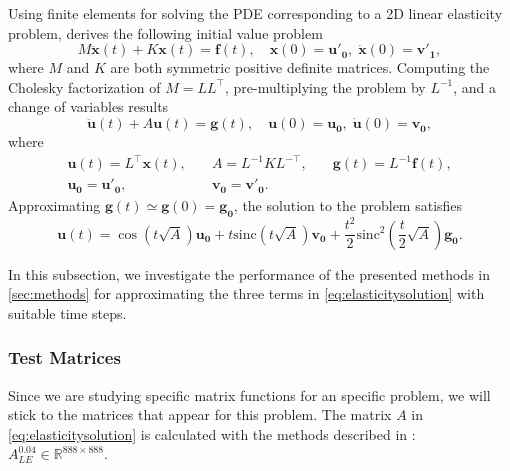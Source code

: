 Using finite elements for solving the PDE corresponding to a 2D linear elasticity problem,
\cite{voet2020linearelasticity} derives the following initial value problem
\begin{equation*}
    M \mathbf{\ddot{x}}(t) + K \mathbf{x}(t) = \mathbf{f}(t), \quad
    \mathbf{x}(0) = \mathbf{u'_0}, \; \mathbf{\dot{x}}(0) = \mathbf{v'_1},
\end{equation*}
where $M$ and $K$ are both symmetric positive definite matrices.
Computing the Cholesky factorization of $M = LL^{\top}$, pre-multiplying the problem by $L^{-1}$,
and a change of variables results
\begin{equation}
    \mathbf{\ddot{u}}(t) + A \mathbf{u}(t) = \mathbf{g}(t), \quad
    \mathbf{u}(0) = \mathbf{u_0}, \; \mathbf{\dot{u}}(0) = \mathbf{v_0},
\end{equation}
where
\begin{equation*}
    \begin{aligned}
        & \mathbf{u}(t) = L^{\top} \mathbf{x}(t), \quad & A = L^{-1} K L^{-\top}, \quad & \mathbf{g}(t) = L^{-1} \mathbf{f}(t), & \\
        & \mathbf{u_0} = \mathbf{u'_0}, & \mathbf{v_0} = \mathbf{v'_0}. & &
    \end{aligned}
\end{equation*}
Approximating $\mathbf{g}(t) \simeq \mathbf{g}(0) = \mathbf{g_0}$, the solution to
the problem satisfies
\begin{equation}
    \label{eq:elasticitysolution}
    \mathbf{u}(t) = \cos(t\sqrt{A}) \mathbf{u_0}
    + t \mathrm{sinc}(t\sqrt{A}) \mathbf{v_0}
    + \frac{t^2}{2} \mathrm{sinc}^2(\frac{t}{2} \sqrt{A}) \mathbf{g_0}.
\end{equation}

In this subsection, we investigate the performance of the presented methods in \autoref{sec:methods}
for approximating the three terms in \eqref{eq:elasticitysolution} with suitable time steps.

\subsubsection*{Test Matrices}
Since we are studying specific matrix functions for an specific problem, we will stick to the
matrices that appear for this problem. The matrix $A$ in \eqref{eq:elasticitysolution} is
calculated with the methods described in \cite{voet2020linearelasticity}:
$A_{LE}^{0.04} \in \mathbb{R}^{888\times888}$.

